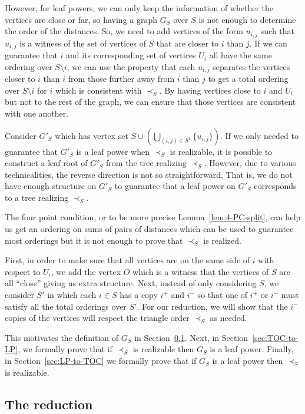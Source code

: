 \documentclass[11pt, letter]{article}
\theoremstyle{remark}
\begin{document}
However, for leaf powers, we can only keep the information of whether the vertices are close or far, so having a graph $G_S$ over $S$ is not enough to determine the order of the distances. So, we need to add vertices of the form $u_{i,j}$ such that $u_{i,j}$ is a witness of the set of vertices of $S$ that are closer to $i$ than $j$. If we can guarantee that $i$ and its corresponding set of vertices $U_i$ all have the same ordering over $S\setminus i$, we can use the property that each $u_{i,j}$ separates the vertices closer to $i$ than $i$ from those further away from $i$ than $j$ to get a total ordering over $S\setminus i$ for $i$ which is consistent with $\prec_S$. By having vertices close to $i$ and $U_i$ but not to the rest of the graph, we can ensure that those vertices are consistent with one another.

Consider $G'_S$ which has vertex set $S\cup \left(\bigcup_{(i,j)\in S^2} \{u_{i,j}\}\right)$. If we only needed to guarantee that $G'_S$ is a leaf power when $\prec_S$ is realizable, it is possible to construct a leaf root of $G'_S$ from the tree realizing $\prec_S$. However, due to various technicalities, the reverse direction is not so straightforward. That is, we do not have enough structure on $G'_S$ to guarantee that a leaf power on $G'_S$ corresponds to a tree realizing $\prec_S$. 

The four point condition, or to be more precise Lemma~\ref{lem:4-PC-split}, can help us get an ordering on sums of pairs of distances which can be used to guarantee most orderings but it is not enough to prove that $\prec_S$ is realized. 

First, in order to make sure that all vertices are on the same side of $i$ with respect to $U_i$, we add the vertex $O$ which is a witness that the vertices of $S$ are all ``close'' giving us extra structure. Next, instead of only considering $S$, we consider $S'$ in which each $i\in S$ has a copy $i^+$ and $i^-$ so that one of $i^+$ or $i^-$ must satisfy all the total orderings over $S'$. For our reduction, we will show that the $i^-$ copies of the vertices will respect the triangle order $\prec_S$ as needed.

This motivates the definition of $G_S$ in Section~\ref{sec:reduction}. Next, in Section~\ref{sec:TOC-to-LP}, we formally prove that if $\prec_S$ is realizable then $G_S$ is a leaf power. Finally, in Section~\ref{sec:LP-to-TOC} we formally prove that if $G_S$ is a leaf power then $\prec_S$ is realizable.

\subsection{The reduction}\label{sec:reduction}
\end{document}
